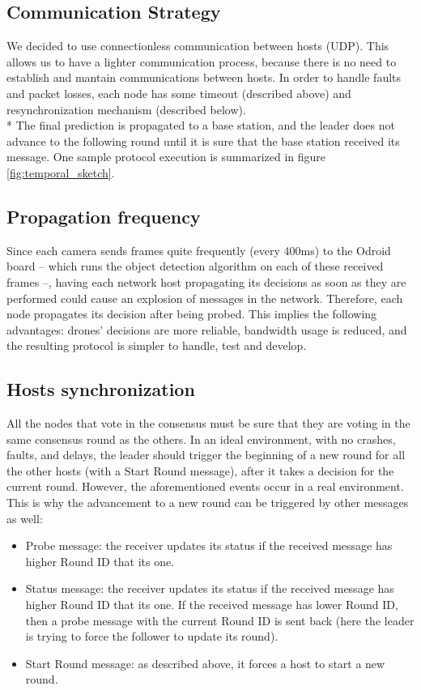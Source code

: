 \documentclass[10pt,conference,compsocconf]{IEEEtran}
\begin{document}
\begin{enumerate}
\subsection{Communication Strategy}We decided to use connectionless communication between hosts (UDP). This allows us to have a lighter communication process, because there is no need to establish and mantain communications between hosts. In order to handle faults and packet losses, each node has some timeout (described above) and resynchronization mechanism (described below).\\*
The final prediction is propagated to a base station, and the leader does not advance to the following round until it is sure that the base station received its message. One sample protocol execution is summarized in figure \ref{fig:temporal_sketch}.
\subsection{Propagation frequency}Since each camera sends frames quite frequently (every 400ms) to the Odroid board -- which runs the object detection algorithm on each of these received frames --, having each network host propagating its decisions as soon as they are performed could cause an explosion of messages in the network. Therefore, each node propagates its decision after being probed. This implies the following advantages: drones' decisions are more reliable, bandwidth usage is reduced, and the resulting protocol is simpler to handle, test and develop.
\subsection{Hosts synchronization}All the nodes that vote in the consensus must be sure that they are voting in the same consensus round as the others. In an ideal environment, with no crashes, faults, and delays, the leader should trigger the beginning of a new round for all the other hosts (with a Start Round message), after it takes a decision for the current round. However, the aforementioned events occur in a real environment. This is why the advancement to a new round can be triggered by other messages as well:
\begin{itemize}
\item Probe message: the receiver updates its status if the received message has higher Round ID that its one.
\item Status message: the receiver updates its status if the received message has higher Round ID that its one. If the received message has lower Round ID, then a probe message with the current Round ID is sent back (here the leader is trying to force the follower to update its round).
\item Start Round message: as described above, it forces a host to start a new round.
\end{itemize}

\end{enumerate}
\end{document}
